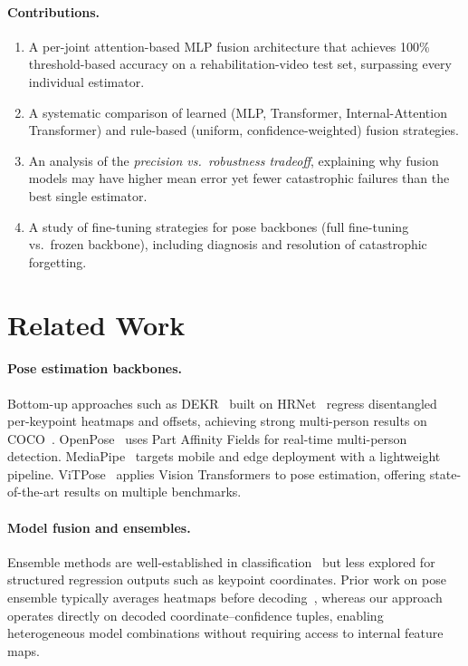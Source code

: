 \documentclass[11pt,a4paper]{article}
\begin{document}
\paragraph{Contributions.}
\begin{enumerate}[nosep]
    \item A per-joint attention-based MLP fusion architecture that achieves
          100\% threshold-based accuracy on a rehabilitation-video test set,
          surpassing every individual estimator.
    \item A systematic comparison of learned (MLP, Transformer,
          Internal-Attention Transformer) and rule-based (uniform,
          confidence-weighted) fusion strategies.
    \item An analysis of the \emph{precision vs.\ robustness tradeoff},
          explaining why fusion models may have higher mean error yet fewer
          catastrophic failures than the best single estimator.
    \item A study of fine-tuning strategies for pose backbones (full
          fine-tuning vs.\ frozen backbone), including diagnosis and resolution
          of catastrophic forgetting.
\end{enumerate}

\section{Related Work}\label{sec:related}

\paragraph{Pose estimation backbones.}
Bottom-up approaches such as DEKR~\cite{geng2021dekr} built on
HRNet~\cite{sun2019hrnet} regress disentangled per-keypoint heatmaps and
offsets, achieving strong multi-person results on COCO~\cite{lin2014coco}.
OpenPose~\cite{cao2017openpose} uses Part Affinity Fields for real-time
multi-person detection.  MediaPipe~\cite{lugaresi2019mediapipe} targets
mobile and edge deployment with a lightweight pipeline.
ViTPose~\cite{xu2022vitpose} applies Vision Transformers to pose estimation,
offering state-of-the-art results on multiple benchmarks.

\paragraph{Model fusion and ensembles.}
Ensemble methods are well-established in classification~\cite{dietterich2000ensemble}
but less explored for structured regression outputs such as keypoint
coordinates.  Prior work on pose ensemble typically averages heatmaps before
decoding~\cite{chen2018cascaded}, whereas our approach operates directly on
decoded coordinate--confidence tuples, enabling heterogeneous model
combinations without requiring access to internal feature maps.
\end{document}
